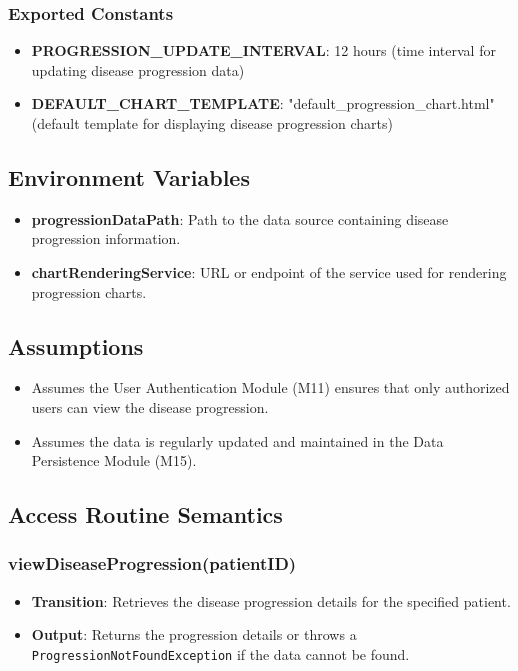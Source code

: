 \documentclass[12pt, titlepage]{article}
\begin{document}
\subsubsection{Exported Constants}
\begin{itemize}
\item \textbf{PROGRESSION\_UPDATE\_INTERVAL}: 12 hours (time interval for updating disease progression data)
\item \textbf{DEFAULT\_CHART\_TEMPLATE}: "default\_progression\_chart.html" (default template for displaying disease progression charts)
\end{itemize}

\subsection{Environment Variables}
\begin{itemize}
\item \textbf{progressionDataPath}: Path to the data source containing disease progression information.
\item \textbf{chartRenderingService}: URL or endpoint of the service used for rendering progression charts.
\end{itemize}

\subsection{Assumptions}
\begin{itemize}
    \item Assumes the User Authentication Module (M11) ensures that only authorized users can view the disease progression.
    \item Assumes the data is regularly updated and maintained in the Data Persistence Module (M15).
\end{itemize}

\subsection{Access Routine Semantics}
\subsubsection{viewDiseaseProgression(patientID)}
\begin{itemize}
    \item \textbf{Transition}: Retrieves the disease progression details for the specified patient.
    \item \textbf{Output}: Returns the progression details or throws a \texttt{ProgressionNotFoundException} if the data cannot be found.
\end{itemize}
\end{document}
